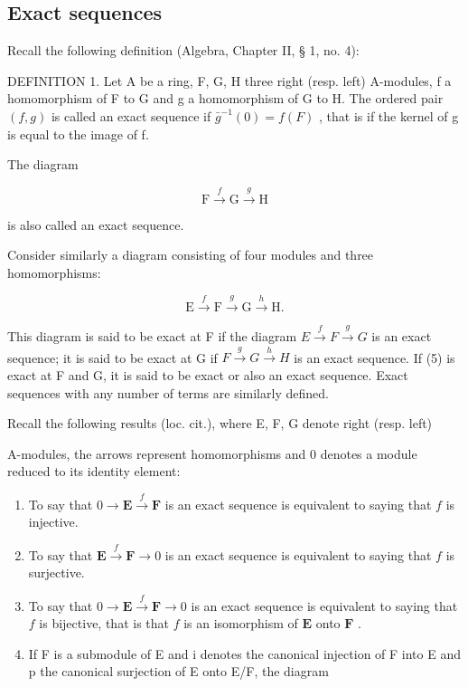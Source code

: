 \subsection{Exact sequences}

Recall the following definition (Algebra, Chapter II, § 1, no. 4):

DEFINITION 1. Let A be a ring, F, G, H three right (resp. left) A-modules, f a homomorphism of F to G and g a homomorphism of G to H. The ordered pair \((f, g)\) is called an exact sequence if \(\bar{g}^{-1}(0) = f(F)\) , that is if the kernel of g is equal to the image of f.

The diagram

\[
\mathrm{F} \xrightarrow {f} \mathrm{G} \xrightarrow {g} \mathrm{H}\tag{4}
\]

is also called an exact sequence.

Consider similarly a diagram consisting of four modules and three homomorphisms:

\[
\mathrm{E} \xrightarrow {f} \mathrm{F} \xrightarrow {g} \mathrm{G} \xrightarrow {h} \mathrm{H}.\tag{5}
\]

This diagram is said to be exact at F if the diagram \(E \xrightarrow{f} F \xrightarrow{g} G\) is an exact sequence; it is said to be exact at G if \(F \xrightarrow{g} G \xrightarrow{h} H\) is an exact sequence. If (5) is exact at F and G, it is said to be exact or also an exact sequence. Exact sequences with any number of terms are similarly defined.

Recall the following results (loc. cit.), where E, F, G denote right (resp. left)

A-modules, the arrows represent homomorphisms and 0 denotes a module reduced to its identity element:

\begin{enumerate}
\def\labelenumi{(\alph{enumi})}
\item
  To say that \(0 \to \mathbf{E} \xrightarrow{f} \mathbf{F}\) is an exact sequence is equivalent to saying that \(f\) is injective.
\item
  To say that \(\mathbf{E} \xrightarrow{f} \mathbf{F} \to 0\) is an exact sequence is equivalent to saying that \(f\) is surjective.
\item
  To say that \(0 \to \mathbf{E} \xrightarrow{f} \mathbf{F} \to 0\) is an exact sequence is equivalent to saying that \(f\) is bijective, that is that \(f\) is an isomorphism of \(\mathbf{E}\) onto \(\mathbf{F}\) .
\item
  If F is a submodule of E and i denotes the canonical injection of F into E and p the canonical surjection of E onto E/F, the diagram
\end{enumerate}

